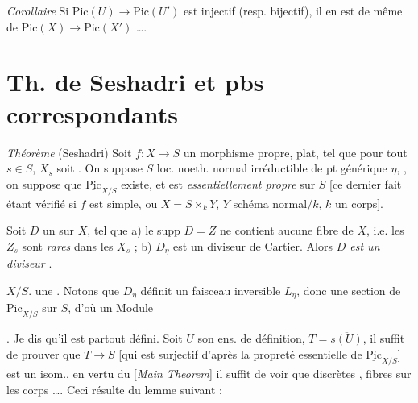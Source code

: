 \documentclass[11pt,a4paper]{article}
\begin{document}

\emph{Corollaire} Si $\mathrm{Pic}(U)\to\mathrm{Pic}(U')$ est injectif (resp. bijectif), il en
est de même de $\mathrm{Pic}(X)\to\mathrm{Pic}(X')$ ….

\section{Th. de Seshadri et pbs correspondants}

\emph{Théorème} (Seshadri) Soit $f\colon X\to S$ un morphisme propre, plat, \struck{\ill{}}
tel que pour tout $s\in S$, 
$X_s$ soit . On suppose $S$ loc.
noeth. normal irréductible de pt générique $\eta$, , on suppose que $\underline{\mathrm{Pic}}_{X/S}$ existe, et est
\emph{essentiellement propre} sur $S$ [ce dernier fait étant vérifié si $f$ est simple, ou
$X=S\times_k Y$, $Y$ schéma normal$/k$, $k$ un corps].

Soit $D$ un   sur $X$, tel que
a) le supp $D=Z$ ne contient aucune \struck{\ill{}} fibre de $X$, i.e. les $Z_s$ sont
\emph{rares} dans les $X_s$ ; b) $D_\eta$ est un diviseur de Cartier. Alors \emph{$D$ est un
diviseur }.


\ill{} \ill{}  \ill{} \ill{} $X/S$. \ill{} une . Notons
que $D_\eta$ définit un faisceau inversible $L_\eta$, donc une section  de
$\underline{\mathrm{Pic}}_{X/S}$ sur $S$, d'où un Module

. Je dis qu'il est partout défini. Soit $U$ son
ens. de définition, $T=\overline{s(U)}$, il suffit de prouver que $T\to S$ [qui est
 surjectif d'après la propreté essentielle de
$\underline{\mathrm{Pic}}_{X/S}$] est un isom., en vertu du [\emph{Main Theorem}] il suffit
de voir que \ill{} discrètes \ill{} \ill{} \ill{}, fibres 
 sur les corps  \ill{} …. Ceci résulte
du lemme suivant :
\end{document}
